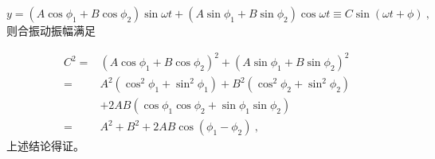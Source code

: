 \begin{equation}
y=\left(A \cos \phi_1+B \cos \phi_2\right) \sin \omega t+\left(A \sin \phi_1+B \sin \phi_2\right) \cos \omega t\equiv C\sin (\omega t+\phi)~,
\end{equation}
则合振动振幅满足

\begin{equation}
\begin{aligned}
C^2
= & \left(A \cos \phi_1+B \cos \phi_2\right)^2+\left(A \sin \phi_1+B \sin \phi_2\right)^2 \\
= & A^2\left(\cos ^2 \phi_1+\sin ^2 \phi_1\right)+B^2\left(\cos ^2 \phi_2+\sin ^2 \phi_2\right) \\
& +2 A B\left(\cos \phi_1 \cos \phi_2+\sin \phi_1 \sin \phi_2\right) \\
= & A^2+B^2+2 A B \cos \left(\phi_1-\phi_2\right)~,
\end{aligned}
\end{equation}
上述结论得证。